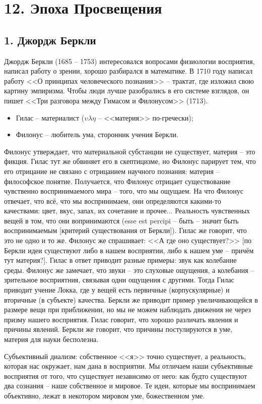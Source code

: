 \documentclass[a4paper, 12pt]{book} %
\begin{document}
\section*{12. Эпоха Просвещения}
\subsection*{1. Джордж Беркли}
Джордж Беркли (1685 -- 1753) интересовался вопросами физиологии восприятия, написал работу о зрении, хорошо разбирался в математике.
В 1710 году написал работу <<О принципах человеческого познания>> -- трактат, где изложил свою картину эмпиризма. Чтобы люди лучше разобрались в его системе взглядов, он пишет <<Три разговора между Гимасом и Филонусом>> (1713).
\begin{itemize}
\item Гилас -- материалист ($\upsilon \lambda \eta$ -- <<материя>> по-гречески);
\item Филонус -- любитель ума, сторонник учения Беркли.
\end{itemize}
Филонус утверждает, что материальной субстанции не существует, материя -- это фикция.	Гилас тут же обвиняет его в скептицизме, но Филонус парирует тем, что его отрицание не связано с отрицанием научного познания: материя -- философское понятие. Получается, что Филонус отрицает существование чувственно воспринимаемого мира -- того, что мы ощущаем. На что Филонус отвечает, что всё, что мы воспринимаем, они определяются какими-то качествами: цвет, вкус, запах, их сочетание и прочее... Реальность чувственных вещей в том, что они вопринимаются (esse est percipi -- быть -- значит быть воспринимаемым [критерий существования от Беркли]). Гилас же говорит, что это не одно и то же. Филонус же спрашивает: <<А где оно существует?>> [по Беркли идеи существуют либо в нашем восприятии, либо  к нашем уме -- причём тут материя?]. Гилас в ответ приводит разные примеры: звук как колебание среды. Филонус же замечает, что звуки -- это слуховые ощущения, а колебания -- зрительное восприятния, связывая одни ощущения с другими. Тогда Гилас приводит учение Локка, где у вещей есть первичные (корпускулярные) и вторичные (в субъекте) качества. Беркли же приводит пример увеличивающейся в размере вещи при приближении, но мы не можем наблюдать движения не через призму нашего восприятия. Гилас говорит, что хорошо различать явления и причины явлений. Беркли же говорит, что причины постулируются в уме, материя для науки бесполезна.

Субъективный диализм: собственное <<я>> точно существует, а реальность, которая нас окружает, нам дана в восприятии. Мы отличаем наши субъективные восприятия от того, что существует независимо от него: как будто существуют два сознания -- наше собственное и мировое. Те идеи, которые мы воспринимаем объективно, лежат в некотором мировом уме, божественном уме.
\end{document}

